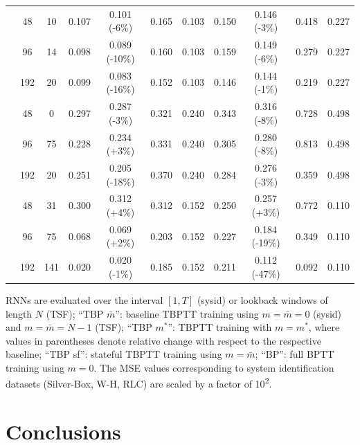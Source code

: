 \documentclass{article} %
\begin{document}
\begin{table}[]
\begin{threeparttable}
\begin{tabular}{ccccccccccc}
			\midrule
			\multirow{3}{*}{\rotatebox{90}{Electr.}}
			& 48 & 10 & 0.107 & 0.101  (-6\%) & 0.165 & 0.103 & 0.150 & 0.146 (-3\%) & 0.418 & 0.227 \\
			& 96 & 14 & 0.098 & 0.089 (-10\%) & 0.160 & 0.103 & 0.159 & 0.149 (-6\%) & 0.279 & 0.227 \\
			&192 & 20 & 0.099 & 0.083 (-16\%) & 0.152 & 0.103 & 0.146 & 0.144 (-1\%) & 0.219 & 0.227 \\
			\midrule
			\multirow{3}{*}{\rotatebox{90}{Traffic}}
			&  48 &  0 & 0.297 & 0.287  (-3\%) & 0.321 & 0.240 & 0.343 & 0.316 (-8\%) & 0.728 & 0.498 \\
			&  96 & 75 & 0.228 & 0.234  (+3\%) & 0.331 & 0.240 & 0.305 & 0.280 (-8\%) & 0.813 & 0.498 \\
			& 192 & 20 & 0.251 & 0.205 (-18\%) & 0.370 & 0.240 & 0.284 & 0.276 (-3\%) & 0.359 & 0.498 \\			
			\midrule
			\multirow{3}{*}{\rotatebox{90}{Solar}}
			& 48 & 31  & 0.300 & 0.312 (+4\%) & 0.312 & 0.152 & 0.250  & 0.257  (+3\%) & 0.772 & 0.110\\
			& 96 & 75  & 0.068 & 0.069 (+2\%) & 0.203 & 0.152 & 0.227  & 0.184 (-19\%) & 0.349 & 0.110\\
			&192 & 141 & 0.020 & 0.020 (-1\%) & 0.185 & 0.152 & 0.211  & 0.112 (-47\%) & 0.092 & 0.110\\
			\bottomrule			
		\end{tabular}
		\endgroup
		\begin{tablenotes}
			\item \small{RNNs are evaluated over the interval $[1,T]$ (sysid) or lookback windows of length $N$ (TSF); ``{\sf TBP $\bar{m}$}'': baseline TBPTT training using $m{=}\bar{m}{=}0$ (sysid) and $m{=}\bar{m}{=}N{-}1$ (TSF); ``{\sf TBP $m^*$}'': TBPTT training with $m{=}m^*$, where values in parentheses denote relative change with respect to the respective baseline; ``{\sf TBP sf}'': stateful TBPTT training using $m{=}\bar{m}$; ``{\sf BP}'': full BPTT training using $m{=}0$.
			The MSE values corresponding to system identification datasets (Silver-Box, W-H, RLC) are scaled by a factor of 10\textsuperscript{2}.}
		\end{tablenotes}
	\end{threeparttable}
\end{table}


\section{Conclusions}
\end{document}
